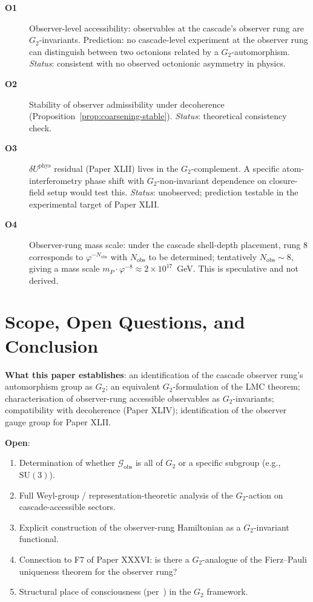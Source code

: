\documentclass[12pt]{article}
\theoremstyle{definition}
\theoremstyle{remark}
\newcommand{\Gtwo}{G_2}
\begin{document}
\begin{description}
\item[\textbf{O1}] Observer-level accessibility: observables at the cascade's observer rung are $\Gtwo$-invariants. Prediction: no cascade-level experiment at the observer rung can distinguish between two octonions related by a $\Gtwo$-automorphism. \emph{Status}: consistent with no observed octonionic asymmetry in physics.
\item[\textbf{O2}] Stability of observer admissibility under decoherence (Proposition~\ref{prop:coarsening-stable}). \emph{Status}: theoretical consistency check.
\item[\textbf{O3}] $\delta U^{\mathrm{phys}}$ residual (Paper XLII) lives in the $\Gtwo$-complement. A specific atom-interferometry phase shift with $\Gtwo$-non-invariant dependence on closure-field setup would test this. \emph{Status}: unobserved; prediction testable in the experimental target of Paper XLII.
\item[\textbf{O4}] Observer-rung mass scale: under the cascade shell-depth placement, rung $8$ corresponds to $\varphi^{-N_{\mathrm{obs}}}$ with $N_{\mathrm{obs}}$ to be determined; tentatively $N_{\mathrm{obs}} \sim 8$, giving a mass scale $m_P \cdot \varphi^{-8} \approx 2 \times 10^{17}$~GeV. This is speculative and not derived.
\end{description}

\section{Scope, Open Questions, and Conclusion}\label{sec:open}

\textbf{What this paper establishes}: an identification of the cascade observer rung's automorphism group as $\Gtwo$; an equivalent $\Gtwo$-formulation of the LMC theorem; characterisation of observer-rung accessible observables as $\Gtwo$-invariants; compatibility with decoherence (Paper XLIV); identification of the observer gauge group for Paper XLII.

\textbf{Open}:
\begin{enumerate}
\item Determination of whether $\mathcal{G}_{\mathrm{obs}}$ is all of $\Gtwo$ or a specific subgroup (e.g., $\mathrm{SU}(3)$).
\item Full Weyl-group / representation-theoretic analysis of the $\Gtwo$-action on cascade-accessible sectors.
\item Explicit construction of the observer-rung Hamiltonian as a $\Gtwo$-invariant functional.
\item Connection to F7 of Paper XXXVI: is there a $\Gtwo$-analogue of the Fierz--Pauli uniqueness theorem for the observer rung?
\item Structural place of consciousness (per~\citep{SmartXXIX}) in the $\Gtwo$ framework.
\end{enumerate}
\end{document}
